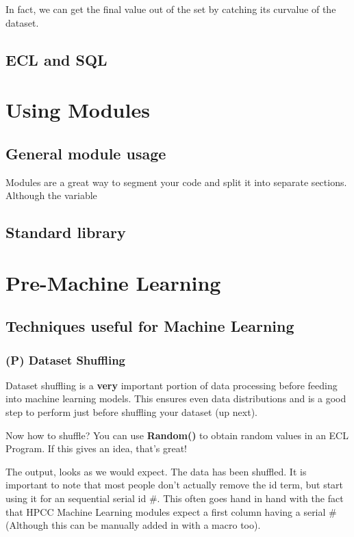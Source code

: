 \documentclass[a4paper,oneside,12pt]{book}
\begin{document}
In fact, we can get the final value out of the set by catching its curvalue of the dataset.

\section{ECL and SQL}

\chapter{Using Modules}
\section{General module usage}
Modules are a great way to segment your code and split it into separate sections.
Although the variable 
\section{Standard library}

\chapter{Pre-Machine Learning}
\section{Techniques useful for Machine Learning}
\subsection{(P) Dataset Shuffling}

Dataset shuffling is a \textbf{very} important portion of data processing before feeding into machine learning models. This ensures even data distributions and is a good step to perform just before shuffling your dataset (up next).

Now how to shuffle? You can use \textbf{Random()} to obtain random values in an ECL Program. If this gives an idea, that's great!



The output, looks as we would expect. The data has been shuffled. It is important to note that most people don't actually remove the id term, but start using it for an sequential serial id \#. This often goes hand in hand with the fact that HPCC Machine Learning modules expect a first column having a serial \# (Although this can be manually added in with a macro too).
\end{document}
